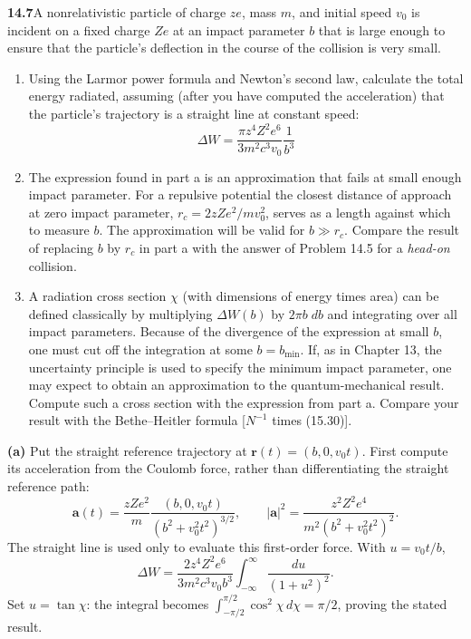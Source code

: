 \par\bigskip
\noindent\textbf{14.7}\quad A nonrelativistic particle of charge $ze$, mass $m$, and initial speed $v_{0}$ is incident on a fixed charge $Ze$ at an impact parameter $b$ that is large enough to ensure that the particle's deflection in the course of the collision is very small.
\begin{enumerate}
\item[(a)] Using the Larmor power formula and Newton's second law, calculate the total energy radiated, assuming (after you have computed the acceleration) that the particle's trajectory is a straight line at constant speed:
\[
\Delta W=\frac{\pi z^{4}Z^{2}e^{6}}{3m^{2}c^{3}v_{0}}\frac{1}{b^{3}}
\]
\item[(b)] The expression found in part a is an approximation that fails at small enough impact parameter. For a repulsive potential the closest distance of approach at zero impact parameter, $r_{c}=2zZe^{2}/mv_{0}^{2}$, serves as a length against which to measure $b$. The approximation will be valid for $b\gg r_{c}$. Compare the result of replacing $b$ by $r_{c}$ in part a with the answer of Problem 14.5 for a \emph{head-on} collision.
\item[(c)] A radiation cross section $\chi$ (with dimensions of energy times area) can be defined classically by multiplying $\Delta W(b)$ by $2\pi b\;db$ and integrating over all impact parameters. Because of the divergence of the expression at small $b$, one must cut off the integration at some $b=b_{\min}$. If, as in Chapter 13, the uncertainty principle is used to specify the minimum impact parameter, one may expect to obtain an approximation to the quantum-mechanical result. Compute such a cross section with the expression from part a. Compare your result with the Bethe--Heitler formula [$N^{-1}$ times (15.30)].
\end{enumerate}
\solution

\textbf{(a)} Put the straight reference trajectory at
$\mathbf r(t)=(b,0,v_0t)$. First compute its acceleration from the
Coulomb force, rather than differentiating the straight reference path:
\[
\mathbf a(t)=\frac{zZe^2}{m}
\frac{(b,0,v_0t)}{(b^2+v_0^2t^2)^{3/2}},\qquad
|\mathbf a|^2=\frac{z^2Z^2e^4}{m^2(b^2+v_0^2t^2)^2}.
\]
The straight line is used only to evaluate this first-order force.
With $u=v_0t/b$,
\[
\Delta W=\frac{2z^4Z^2e^6}{3m^2c^3v_0b^3}
\int_{-\infty}^\infty\frac{du}{(1+u^2)^2}.
\]
Set $u=\tan\chi$: the integral becomes
$\int_{-\pi/2}^{\pi/2}\cos^2\chi\,d\chi=\pi/2$, proving the stated result.


